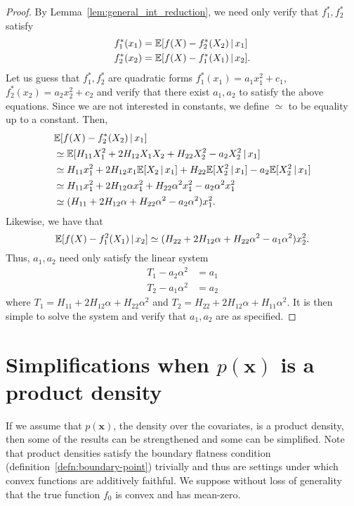 \documentclass[12pt,pdftex,aos,noinfoline,addressasfootnote]{imsart}
\begin{document}
\begin{proof}
By Lemma~\ref{lem:general_int_reduction}, we need only verify that $f^*_1, f^*_2$ satisfy
\begin{align*}
f^*_1(x_1) &= {\mathbb E}[ f(X) - f_2^*(X_2) {\,|\,} x_1] \\
f^*_2(x_2) &= {\mathbb E}[ f(X) - f_1^*(X_1) {\,|\,} x_2 ] .
\end{align*}
Let us guess that $f^*_1, f^*_2$ are quadratic forms $f^*_1(x_1) = a_1 x_1^2 + c_1$, $f^*_2(x_2) = a_2 x_2^2 + c_2$ and verify that there exist $a_1, a_2$ to satisfy the above equations. Since we are not interested in constants, we define $\simeq$ to be equality up to a constant. 
Then, 
\begin{align*}
&{\mathbb E}[ f(X) - f_2^*(X_2) {\,|\,} x_1]\\
& \simeq {\mathbb E}[ H_{11} X_1^2 + 2H_{12}X_1 X_2 + H_{22}X_2^2 - a_2 X_2^2 {\,|\,} x_1 ] \\ 
    &\simeq H_{11} x_1^2 + 2 H_{12} x_1 {\mathbb E}[X_2 {\,|\,} x_1] + H_{22} {\mathbb E}[X_2^2 {\,|\,} x_1] - a_2{\mathbb E}[X_2^2 {\,|\,} x_1] \\
   &\simeq H_{11} x_1^2 + 2H_{12} \alpha x_1^2 + H_{22} \alpha^2 x_1^2 - a_2 \alpha^2 x_1^2\\
   &\simeq (H_{11} + 2 H_{12} \alpha + H_{22} \alpha^2 - a_2 \alpha^2) x_1^2.
\end{align*}
Likewise, we have that
\[
{\mathbb E}[ f(X) - f_1^2(X_1) {\,|\,} x_2] \simeq (H_{22} + 2H_{12}\alpha + H_{22}\alpha^2 - a_1 \alpha^2) x_2^2.
\]
Thus, $a_1, a_2$ need only satisfy the linear system
\begin{align*}
T_1 - a_2 \alpha^2 &= a_1 \\
T_2 - a_1 \alpha^2 &= a_2 
\end{align*}
where $T_1 = H_{11} + 2H_{12} \alpha + H_{22} \alpha^2$ and $T_2 = H_{22} + 2H_{12} \alpha + H_{11} \alpha^2$.
It is then simple to solve the system and verify that $a_1, a_2$ are as specified.
\end{proof}


\section{Simplifications when $p(\mathbf{x})$ is a product density}
\label{sec:prod_density_simplification}

If we assume that $p(\mathbf{x})$, the density over the covariates, is a product density, then some of the results can be strengthened and some can be simplified. Note that product densities satisfy the boundary flatness condition (definition~\ref{defn:boundary-point}) trivially and thus are settings under which convex functions are additively faithful. We suppose without loss of generality that the true function $f_0$ is convex and has mean-zero.
\end{document}
